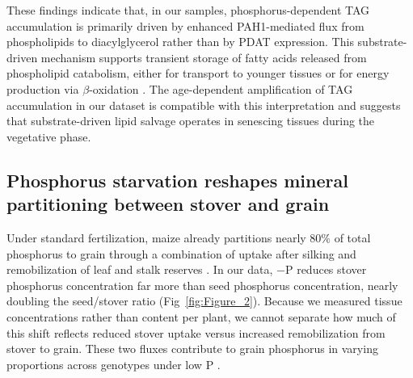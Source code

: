 \documentclass[9pt,twocolumn,twoside]{rilabRxiv}
\begin{document}
These findings indicate that, in our samples, phosphorus-dependent TAG accumulation is primarily driven by enhanced PAH1-mediated flux from phospholipids to diacylglycerol rather than by PDAT expression.
This substrate-driven mechanism supports transient storage of fatty acids released from phospholipid catabolism, either for transport to younger tissues or for energy production via $\beta$-oxidation \cite{wang2020a}.
The age-dependent amplification of TAG accumulation in our dataset is compatible with this interpretation and suggests that substrate-driven lipid salvage operates in senescing tissues during the vegetative phase.

\subsection*{Phosphorus starvation reshapes mineral partitioning between stover and grain}

Under standard fertilization, maize already partitions nearly $80\%$ of total phosphorus to grain through a combination of uptake after silking and remobilization of leaf and stalk reserves \citep{bender2013,veneklaas2012}.
In our data, $-$P reduces stover phosphorus concentration far more than seed phosphorus concentration, nearly doubling the seed/stover ratio (Fig~\ref{fig:Figure_2}).
Because we measured tissue concentrations rather than content per plant, we cannot separate how much of this shift reflects reduced stover uptake versus increased remobilization from stover to grain. These two fluxes contribute to grain phosphorus in varying proportions across genotypes under low P \citep{sun2023,roller2025}.
\end{document}
